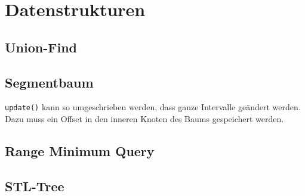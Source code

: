 \section{Datenstrukturen}

\subsection{Union-Find}


\subsection{Segmentbaum}

\lstinline{update()} kann so umgeschrieben werden, dass ganze Intervalle geändert werden.
Dazu muss ein Offset in den inneren Knoten des Baums gespeichert werden.

\subsection{Range Minimum Query}


\subsection{STL-Tree}

